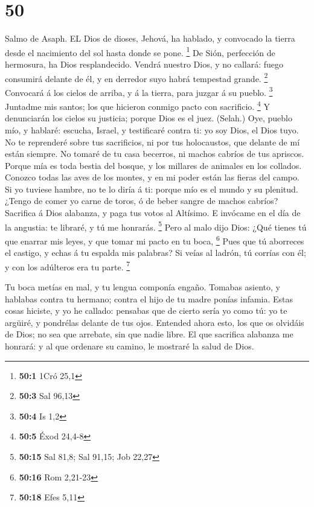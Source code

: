 \hypertarget{section-49}{%
\section{50}\label{section-49}}

 Salmo de Asaph. EL Dios de dioses, Jehová, ha hablado, y
convocado la tierra desde el nacimiento del sol hasta donde se pone.
\footnote{\textbf{50:1} 1Cró 25,1}  De Sión, perfección de
hermosura, ha Dios resplandecido.  Vendrá nuestro Dios, y no
callará: fuego consumirá delante de él, y en derredor suyo habrá
tempestad grande. \footnote{\textbf{50:3} Sal 96,13} 
Convocará á los cielos de arriba, y á la tierra, para juzgar á su
pueblo. \footnote{\textbf{50:4} Is 1,2}  Juntadme mis
santos; los que hicieron conmigo pacto con sacrificio. \footnote{\textbf{50:5}
  Éxod 24,4-8}  Y denunciarán los cielos su justicia; porque
Dios es el juez. (Selah.)  Oye, pueblo mío, y hablaré:
escucha, Israel, y testificaré contra ti: yo soy Dios, el Dios tuyo.
 No te reprenderé sobre tus sacrificios, ni por tus
holocaustos, que delante de mí están siempre.  No tomaré de
tu casa becerros, ni machos cabríos de tus apriscos. 
Porque mía es toda bestia del bosque, y los millares de animales en los
collados.  Conozco todas las aves de los montes, y en mi
poder están las fieras del campo.  Si yo tuviese hambre, no
te lo diría á ti: porque mío es el mundo y su plenitud. 
¿Tengo de comer yo carne de toros, ó de beber sangre de machos cabríos?
 Sacrifica á Dios alabanza, y paga tus votos al Altísimo.
 E invócame en el día de la angustia: te libraré, y tú me
honrarás. \footnote{\textbf{50:15} Sal 81,8; Sal 91,15; Job 22,27}
 Pero al malo dijo Dios: ¿Qué tienes tú que enarrar mis
leyes, y que tomar mi pacto en tu boca, \footnote{\textbf{50:16} Rom
  2,21-23}  Pues que tú aborreces el castigo, y echas á tu
espalda mis palabras?  Si veías al ladrón, tú corrías con
él; y con los adúlteros era tu parte. \footnote{\textbf{50:18} Efes 5,11}

 Tu boca metías en mal, y tu lengua componía engaño.
 Tomabas asiento, y hablabas contra tu hermano; contra el
hijo de tu madre ponías infamia.  Estas cosas hiciste, y yo
he callado: pensabas que de cierto sería yo como tú: yo te argüiré, y
pondrélas delante de tus ojos.  Entended ahora esto, los
que os olvidáis de Dios; no sea que arrebate, sin que nadie libre.
 El que sacrifica alabanza me honrará: y al que ordenare su
camino, le mostraré la salud de Dios.

